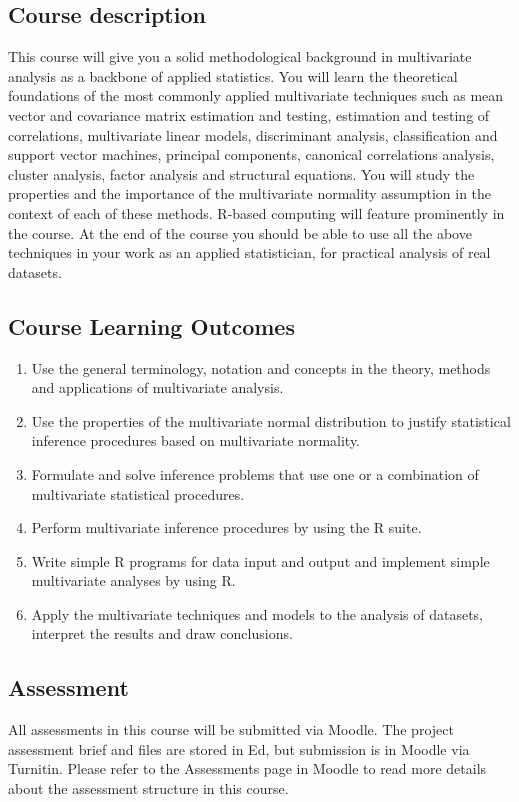 \documentclass[11pt]{article}
\begin{document}
\subsection{Course description}\label{subsec:course-description}
This course will give you a solid methodological background in multivariate
analysis as a backbone of applied statistics.
You will learn the theoretical foundations of the most commonly applied
multivariate techniques such as mean vector and covariance matrix estimation
and testing, estimation and testing of correlations, multivariate linear models,
discriminant analysis, classification and support vector machines, principal
components, canonical correlations analysis, cluster analysis, factor analysis
and structural equations.
You will study the properties and the importance of the multivariate normality
assumption in the context of each of these methods.
R-based computing will feature prominently in the course.
At the end of the course you should be able to use all the above techniques in
your work as an applied statistician, for practical analysis of real datasets.

\subsection{Course Learning Outcomes}\label{subsec:course-learning-outcomes}
\begin{enumerate}
  \item Use the general terminology, notation and concepts in the theory, methods and  applications of multivariate analysis.
  \item Use the properties of the multivariate normal distribution to justify statistical inference procedures based on multivariate normality.
  \item Formulate and solve inference problems that use one or a combination of multivariate statistical procedures.
  \item Perform multivariate inference procedures by using the R suite.
  \item Write simple R programs for data input and output and implement simple multivariate analyses by using R.
  \item Apply the multivariate techniques and models to the analysis of datasets, interpret the results and draw conclusions.
\end{enumerate}

\subsection{Assessment}\label{subsec:assessment}
All assessments in this course will be submitted via Moodle.
The project assessment brief and files are stored in Ed, but submission is in Moodle via Turnitin.
Please refer to the Assessments page in Moodle to read more details about the assessment structure in this course.
\end{document}
